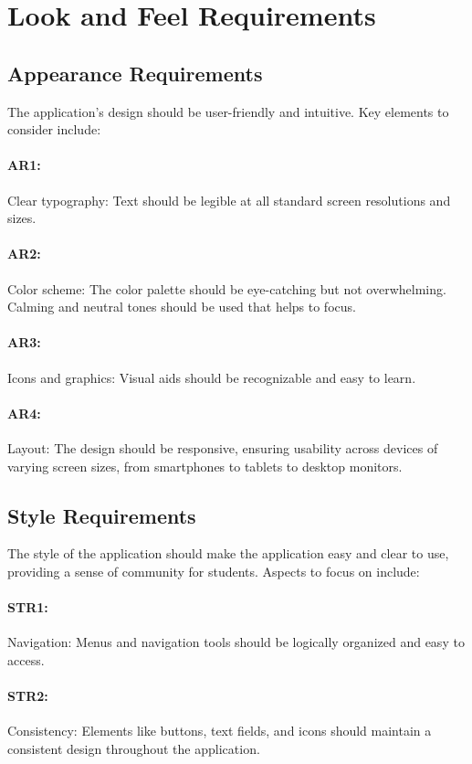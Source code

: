 \documentclass[12pt]{article}
\begin{document}
\section{Look and Feel Requirements}

\subsection{Appearance Requirements}
The application's design should be user-friendly and intuitive. Key elements to consider include:
\paragraph{AR1:} Clear typography: Text should be legible at all standard screen resolutions and sizes. 
\paragraph{AR2:}Color scheme: The color palette should be eye-catching but not overwhelming. Calming and neutral tones should be used that helps to focus.
\paragraph{AR3:}Icons and graphics: Visual aids should be recognizable and easy to learn.
\paragraph{AR4:}Layout: The design should be responsive, ensuring usability across devices of varying screen sizes, from smartphones to tablets to desktop monitors.

\subsection{Style Requirements}
The style of the application should make the application easy and clear to use, providing a sense of community for students. Aspects to focus on include:
\paragraph{STR1:}Navigation: Menus and navigation tools should be logically organized and easy to access. 
\paragraph{STR2:}Consistency: Elements like buttons, text fields, and icons should maintain a consistent design throughout the application.
\end{document}
